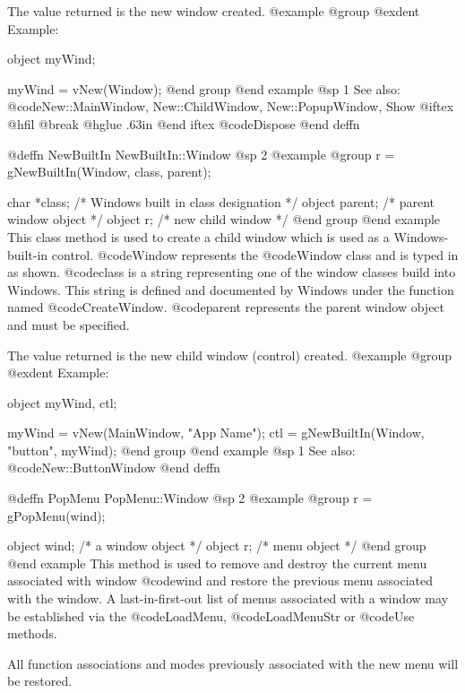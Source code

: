 The value returned is the new window created.
@example
@group
@exdent Example:

object  myWind;

myWind = vNew(Window);
@end group
@end example
@sp 1
See also:  @code{New::MainWindow, New::ChildWindow, New::PopupWindow, Show}
@iftex
@hfil @break @hglue .63in   
@end iftex
@code{Dispose}
@end deffn







@deffn {NewBuiltIn} NewBuiltIn::Window
@sp 2
@example
@group
r = gNewBuiltIn(Window, class, parent);

char    *class; /*  Windows built in class designation  */
object  parent; /*  parent window object                */
object  r;      /*  new child window                    */
@end group
@end example
This class method is used to create a child window which is used as a
Windows-built-in control.  @code{Window} represents the @code{Window}
class and is typed in as shown.  @code{class} is a string representing
one of the window classes build into Windows.  This string is defined
and documented by Windows under the function named @code{CreateWindow}.
@code{parent} represents the parent window object and must be specified.

The value returned is the new child window (control) created.
@example
@group
@exdent Example:

object  myWind, ctl;

myWind = vNew(MainWindow, "App Name");
ctl = gNewBuiltIn(Window, "button", myWind);
@end group
@end example
@sp 1
See also:  @code{New::ButtonWindow}
@end deffn












@deffn {PopMenu} PopMenu::Window
@sp 2
@example
@group
r = gPopMenu(wind);

object   wind;  /*  a window object  */
object   r;     /*  menu object      */
@end group
@end example
This method is used to remove and destroy the current menu associated
with window @code{wind} and restore the previous menu associated with
the window.  A last-in-first-out list of menus associated with a window
may be established via the @code{LoadMenu}, @code{LoadMenuStr} or
@code{Use} methods.

All function associations and modes previously associated with the
new menu will be restored.


